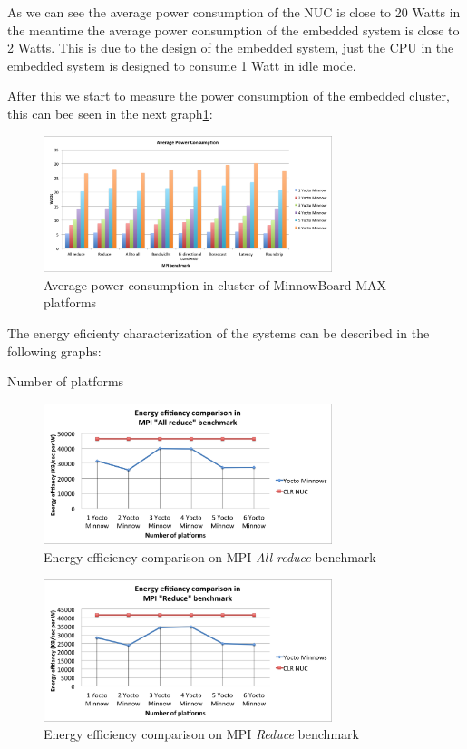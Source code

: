 As we can see the average power consumption of the NUC is close to 20 Watts in
the meantime the average power consumption of the embedded system is close to
2 Watts. This is due to the design of the embedded system, just the CPU in the
embedded system is designed to consume 1 Watt in idle mode.

After this we start to measure the power consumption of the embedded cluster,
this can bee seen in the next graph\ref{power_average_minnow}: 

\begin{figure}[H]
\centering
\includegraphics[width=0.75\textwidth]{images/power_average.png}
\caption{Average power consumption in cluster of MinnowBoard MAX platforms}
\label{power_average_minnow}
\end{figure}


The energy eficienty characterization of the systems can be described in the
following graphs: 

Number of platforms

\begin{figure}[H]
\centering
\includegraphics[width=0.75\textwidth]{images/energy_results/allreduce.png}
\caption{Energy efficiency comparison on MPI \textit{All reduce} benchmark}
\label{all_reduce_energy}
\end{figure}


\begin{figure}[H]
\centering
\includegraphics[width=0.75\textwidth]{images/energy_results/reduce.png}
\caption{Energy efficiency comparison on MPI \textit{Reduce} benchmark}
\label{reduce_energy}
\end{figure}


